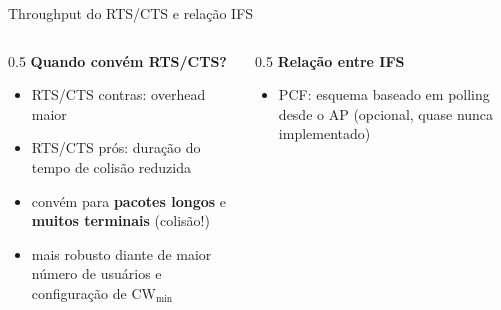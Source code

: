 \documentclass[aspectratio=169,11pt]{beamer}
\begin{document}
\begin{frame}{Throughput do RTS/CTS e relação IFS}
  \begin{columns}
    \begin{column}{0.5\textwidth}
      \textbf{Quando convém RTS/CTS?}
      \begin{itemize}
        \item RTS/CTS contras: overhead maior
        \item RTS/CTS prós: duração do tempo de colisão reduzida
        \item convém para \textbf{pacotes longos} e \textbf{muitos terminais} (colisão!)
        \item mais robusto diante de maior número de usuários e configuração de $\mathrm{CW}_{\min}$
      \end{itemize}
    \end{column}
    \begin{column}{0.5\textwidth}
      \textbf{Relação entre IFS}
      \begin{center}
      \end{center}
      \begin{itemize}
        \item PCF: esquema baseado em polling desde o AP (opcional, quase nunca implementado)
      \end{itemize}
    \end{column}
  \end{columns}
\end{frame}
\end{document}
